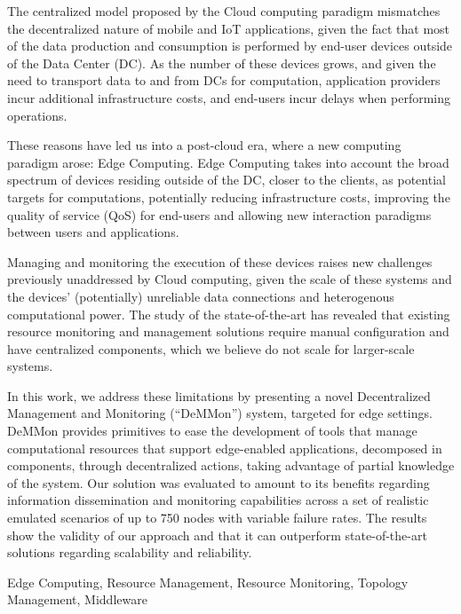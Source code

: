 

The centralized model proposed by the Cloud computing paradigm mismatches the decentralized nature of mobile and IoT applications, given the fact that most of the data production and consumption is performed by end-user devices outside of the Data Center (DC). As the number of these devices grows, and given the need to transport data to and from DCs for computation, application providers incur additional infrastructure costs, and end-users incur delays when performing operations. 

These reasons have led us into a post-cloud era, where a new computing paradigm arose: Edge Computing. Edge Computing takes into account the broad spectrum of devices residing outside of the DC, closer to the clients, as potential 
targets for computations, potentially reducing infrastructure costs, improving the quality of service (QoS) for end-users and allowing new interaction paradigms between users and applications. 

Managing and monitoring the execution of these devices raises new challenges previously unaddressed by Cloud computing, given the scale of these systems and the devices' (potentially) unreliable data connections and heterogenous computational power. The study of the state-of-the-art has revealed that existing resource monitoring and management solutions require manual configuration and have centralized components, which we believe do not scale for larger-scale systems. 

In this work, we address these limitations by presenting a novel Decentralized Management and Monitoring (``DeMMon'') system, targeted for edge settings. DeMMon provides primitives to ease the development of tools that manage computational resources that support edge-enabled applications, decomposed in components, through decentralized actions, taking advantage of partial knowledge of the system. Our solution was evaluated to amount to its benefits regarding information dissemination and monitoring capabilities across a set of realistic emulated scenarios of up to 750 nodes with variable failure rates. The results show the validity of our approach and that it can outperform state-of-the-art solutions regarding scalability and reliability. 


\begin{keywords}
  Edge Computing, Resource Management, Resource Monitoring, Topology Management, Middleware
\end{keywords} 
